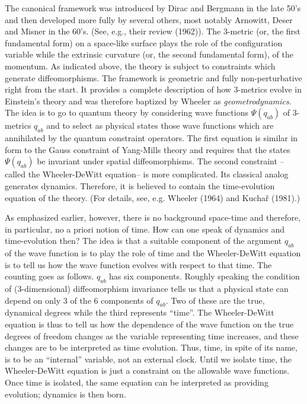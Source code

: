 The canonical framework was introduced by Dirac and Bergmann in the late 50's
and then developed more fully by several others, most notably Arnowitt,
Deser and Misner in the 60's. (See, e.g., their review (1962)). The 3-metric
(or, the first fundamental form) on
a space-like surface plays the role of the configuration variable while the
extrinsic curvature (or, the second fundamental form), of the momentum. As
indicated above, the theory is subject to constraints which generate
diffeomorphisms. The framework is geometric and fully non-perturbative right
from the start. It provides a complete description of how 3-metrics evolve in
Einstein's theory and was therefore baptized by Wheeler as {\it
geometrodynamics}. The idea is to go to quantum theory by considering wave
functions $\Psi (q_{ab})$ of 3-metrics $q_{ab}$ and to select as physical
states those wave functions which are annihilated by the quantum constraint
operators. The first equation is similar in form to the Gauss constraint of
Yang-Mills theory and requires that the states $\Psi(q_{ab})$ be invariant
under spatial diffeomorphisms. The second constraint --called the
Wheeler-DeWitt equation-- is more complicated. Its classical analog generates
dynamics. Therefore, it is believed to contain the time-evolution equation of
the theory. (For details, see, e.g. Wheeler (1964) and Kucha\v r (1981).)

As emphasized earlier, however, there is no background space-time
and therefore, in particular, no a priori notion of time. How can one speak of
dynamics and time-evolution then? The idea is that a suitable component of the
argument $q_{ab}$ of the wave function is to play the role of time and the
Wheeler-DeWitt equation is to tell us how the wave function evolves with
respect to that time. The counting goes as follows. $q_{ab}$ has six
components. Roughly speaking the condition of (3-dimensional) diffeomorphism
invariance tells us that a physical state can depend on only 3 of the 6
components of $q_{ab}$. Two of these are the true, dynamical degrees while the
third represents ``time''. The Wheeler-DeWitt equation is thus to tell us
how the dependence of the wave function on the true degrees of freedom changes
as the variable representing time increases, and these changes are to be
interpreted as time evolution. Thus, time, in spite of its name, is to be
an ``internal'' variable, not an external clock. Until we isolate time, the
Wheeler-DeWitt equation is just a constraint on the allowable wave functions.
Once time is isolated, the same equation can be interpreted as providing
evolution; dynamics is then born.

